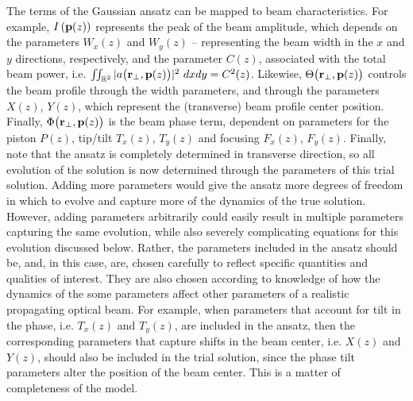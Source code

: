 \documentclass[9pt,twocolumn,twoside]{osajnl}
\newcommand{\R}{\mathbb{R}}
\begin{document}
The terms of the Gaussian ansatz can be mapped to beam characteristics.  
For example, $I\left( {\bf p}(z) \right)$ represents 
the peak of the beam amplitude, which depends on the parameters $W_{x}(z)$ and $W_{y}(z)$ --
representing the beam width in the $x$ and $y$ directions, respectively, 
and the parameter $C(z)$, associated with the total beam power, i.e.
$\iint_{\R^{2}} |a\big( {\bf r}_{\perp}, {\bf p}(z) \big)|^{2} \ dxdy = C^{2}(z)$.  
Likewise, $\Theta\big( {\bf r}_{\perp} ,{\bf p}(z) \big)$ controls the beam profile 
through the width parameters, and through the parameters $X(z)$, $Y(z)$, which represent 
the (transverse) beam profile center position.  Finally, $\Phi\big( {\bf r}_{\perp} ,{\bf p}(z) \big)$ 
is the beam phase term, dependent on parameters for the piston $P(z)$, 
tip/tilt $T_{x}(z)$, $T_{y}(z)$ and focusing $F_{x}(z)$, $F_{y}(z)$.  Finally, 
note that the ansatz is completely determined in transverse direction, so all 
evolution of the solution is now determined through the parameters of this trial solution.  
Adding more parameters would give the ansatz more degrees of freedom in which to 
evolve and capture more of the dynamics of the true solution.  However, adding 
parameters arbitrarily could easily result in multiple parameters capturing the same 
evolution, while also severely complicating equations for this evolution discussed below.  
Rather, the parameters included in the ansatz should be, and, in this case, are, chosen carefully to reflect specific quantities and qualities of interest.
They are also chosen according to knowledge of how the dynamics of the some parameters affect other parameters of a realistic propagating optical beam.  
For example, when parameters that account for tilt in the phase, i.e. $T_{x}(z)$ and $T_{y}(z)$, are included in the ansatz, then the corresponding parameters that capture shifts in the beam center, i.e. $X(z)$ and $Y(z)$, should also be included in the trial solution, since the phase tilt parameters alter the position of the beam center.  
This is a matter of completeness of the model.  
\end{document}
